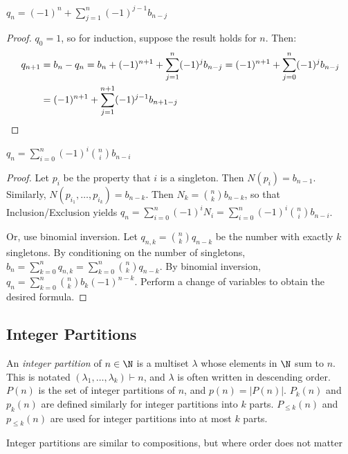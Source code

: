 \documentclass[a4paper]{article}
\begin{document}
\begin{corollary}
$q_n=(-1)^n+\sum_{j=1}^n(-1)^{j-1}b_{n-j}$

\begin{hl}
\begin{proof}
$q_0=1$, so for induction, suppose the result holds for $n$. Then:
\begin{align*}
q_{n+1}
&=b_n-q_n
=b_n+(-1)^{n+1}+\sum_{j=1}^n(-1)^{j}b_{n-j}
=(-1)^{n+1}+\sum_{j=0}^n(-1)^{j}b_{n-j}\\
&=(-1)^{n+1}+\sum_{j=1}^{n+1}(-1)^{j-1}b_{n+1-j}\qedhere
\end{align*}
\end{proof}
\end{hl}
\end{corollary}

\begin{example}
$q_n=\sum_{i=0}^n(-1)^i\binom nib_{n-i}$

\begin{hl}
\begin{proof}
Let $p_i$ be the property that $i$ is a singleton. Then $N(p_i)=b_{n-1}$. Similarly, $N(p_{i_1},\dots,p_{i_k})=b_{n-k}$. Then $N_k=\binom nkb_{n-k}$, so that Inclusion/Exclusion yields $q_n=\sum_{i=0}^n(-1)^iN_i=\sum_{i=0}^n(-1)^i\binom nib_{n-i}$.

\medskip

Or, use binomial inversion. Let $q_{n,k}=\binom nkq_{n-k}$ be the number with exactly $k$ singletons. By conditioning on the number of singletons, $b_n=\sum_{k=0}^nq_{n,k}=\sum_{k=0}^n\binom nkq_{n-k}$. By binomial inversion, $q_n=\sum_{k=0}^n\binom nkb_k(-1)^{n-k}$. Perform a change of variables to obtain the desired formula.
\end{proof}
\end{hl}
\end{example}



\subsection{Integer Partitions}

\begin{definition}
An \emph{integer partition} of $n\in\N$ is a multiset $\lambda$ whose elements in $\N$ sum to $n$. This is notated $(\lambda_1,\dots,\lambda_k)\vdash n$, and $\lambda$ is often written in descending order. $P(n)$ is the set of integer partitions of $n$, and $p(n)=|P(n)|$. $P_k(n)$ and $p_k(n)$ are defined similarly for integer partitions into $k$ parts. $P_{\leq k}(n)$ and $p_{\leq k}(n)$ are used for integer partitions into at most $k$ parts.

\begin{arrows}
\item Integer partitions are similar to compositions, but where order does not matter
\end{arrows}
\end{definition}
\end{document}
